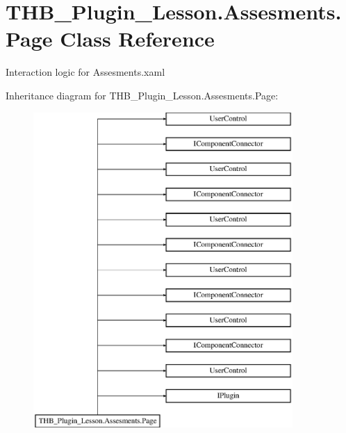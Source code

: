 \hypertarget{class_t_h_b___plugin___lesson_1_1_assesments_1_1_page}{}\section{T\+H\+B\+\_\+\+Plugin\+\_\+\+Lesson.\+Assesments.\+Page Class Reference}
\label{class_t_h_b___plugin___lesson_1_1_assesments_1_1_page}


Interaction logic for Assesments.\+xaml  


Inheritance diagram for T\+H\+B\+\_\+\+Plugin\+\_\+\+Lesson.\+Assesments.\+Page\+:\begin{figure}[H]
\begin{center}
\leavevmode
\includegraphics[height=12.000000cm]{d9/ddd/class_t_h_b___plugin___lesson_1_1_assesments_1_1_page}
\end{center}
\end{figure}
